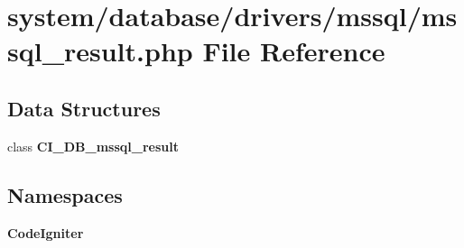 \section{system/database/drivers/mssql/mssql\-\_\-result.php File Reference}
\label{mssql__result_8php}
\subsection*{Data Structures}
\begin{DoxyCompactItemize}
\item 
class {\bf C\-I\-\_\-\-D\-B\-\_\-mssql\-\_\-result}
\end{DoxyCompactItemize}
\subsection*{Namespaces}
\begin{DoxyCompactItemize}
\item 
{\bf Code\-Igniter}
\end{DoxyCompactItemize}
